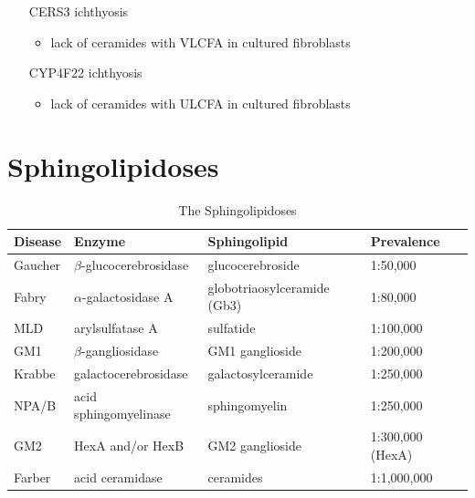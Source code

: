 \documentclass{scrartcl}
\begin{document}
\begin{enumerate}
\begin{itemize}
\item[{CERS3}] ichthyosis
\begin{itemize}
\item lack of ceramides with VLCFA in cultured fibroblasts
\end{itemize}
\item[{CYP4F22}] ichthyosis
\begin{itemize}
\item lack of ceramides with ULCFA in cultured fibroblasts
\end{itemize}
\end{itemize}
\end{enumerate}

\section{Sphingolipidoses}
\label{sec:org72526d5}

\begin{table}[htbp]
\caption{\label{tab:org0dc29ba}
The Sphingolipidoses}
\centering
\begin{tabular}{llll}
Disease & Enzyme & Sphingolipid & Prevalence\\
\hline
Gaucher & \(\beta\)-glucocerebrosidase & glucocerebroside & 1:50,000\\
Fabry & \(\alpha\)-galactosidase A & globotriaosylceramide (Gb3) & 1:80,000\\
MLD & arylsulfatase A & sulfatide & 1:100,000\\
GM1 & \(\beta\)-gangliosidase & GM1 ganglioside & 1:200,000\\
Krabbe & galactocerebrosidase & galactosylceramide & 1:250,000\\
NPA/B & acid sphingomyelinase & sphingomyelin & 1:250,000\\
GM2 & HexA and/or HexB & GM2 ganglioside & 1:300,000 (HexA)\\
Farber & acid ceramidase & ceramides & 1:1,000,000\\
\end{tabular}
\end{table}
\end{document}
